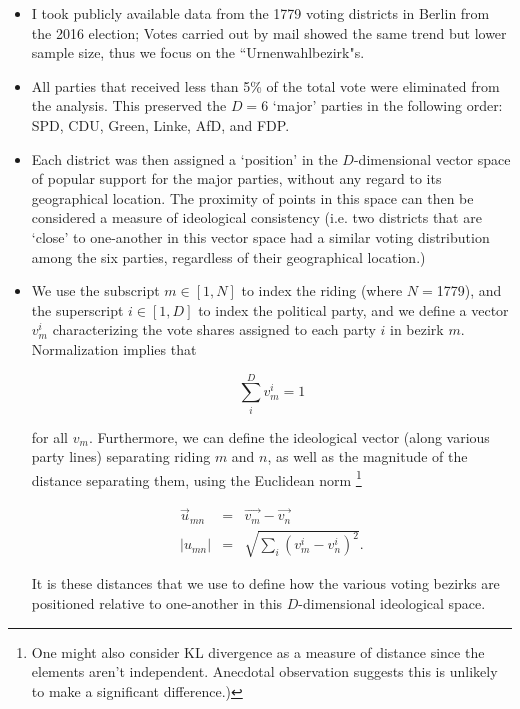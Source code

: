 \documentclass[amsmath,amssymb,nofootinbib,12pt,preprint]{revtex4}
\begin{document}
\begin{itemize}
\item  I took publicly available data from the  1779 voting districts in Berlin from the 2016 election; Votes carried out by mail showed the same trend but lower sample size, thus we focus on the ``Urnenwahlbezirk"s.

\item All parties that received less than 5\% of the total vote were eliminated from the analysis. This preserved the $D=$6 `major'  parties in the following order: SPD, CDU, Green, Linke, AfD, and FDP.

\item Each district was then assigned a `position' in the $D$-dimensional vector space of popular support for the major parties, without any regard to its geographical location. The proximity of points in this space can then be considered a measure of ideological consistency (i.e. two districts that are `close' to one-another in this vector space had a similar voting distribution among the six parties, regardless of their geographical location.)

\item We use the subscript $m\in [1,N]$ to index the riding (where $N=$1779), and the superscript $i\in [1,D]$ to index the political party, and we define a vector $v^{i}_{m}$ characterizing the vote shares assigned to each party $i$ in bezirk $m$. Normalization implies that 

\begin{equation}
\sum\limits_{i}^{D}v^i_m =1
\end{equation}

for all $v_m$. Furthermore, we can define the ideological vector (along various party lines) separating riding $m$ and $n$, as well as the magnitude of the distance separating them, using the Euclidean norm \footnote{ One might also consider KL divergence as a measure of distance since the elements aren't independent. Anecdotal observation suggests this is unlikely to make a significant difference.) } 

\begin{align}
\vec u_{mn} &=& \vec {v_m} - \vec{v_n} \\
\left| u_{mn}\right| &=& \sqrt{  \sum\limits_{i}\left( v_m^i - v_n^i \right)^2 }.
\end{align}

It is these distances that we use to define how the various voting bezirks are positioned relative to one-another in this $D$-dimensional ideological space.

\end{itemize}
\end{document}
